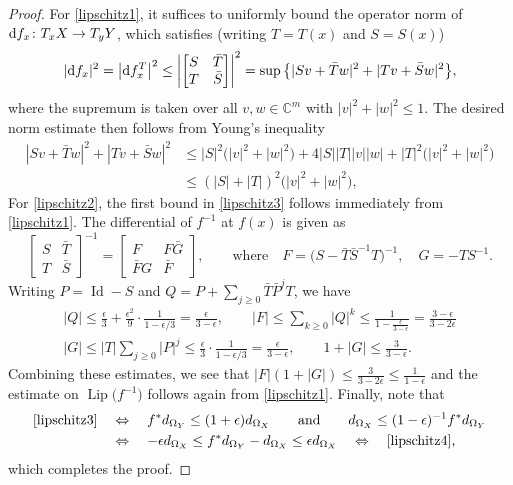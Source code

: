\documentclass[10pt,a4paper]{amsart}
\numberwithin{equation}{section}
\theoremstyle{definition}
\newcommand{\C}{\mathbb{C}} %
\newcommand{\1}{{\bf 1}}
\newcommand{\Id}{\operatorname{Id}}
\DeclareMathOperator{\Lip}{Lip}
\begin{document}
\begin{proof} For \ref{lipschitz1}, it suffices to uniformly bound the operator norm of ${\rm d}f_x\colon T_xX \rightarrow T_yY$, which satisfies (writing $T=T(x)$ and $S=S(x)$)
\[
\vert {\rm d}f_x \vert^2 = \big\vert {\rm d}f_x^T \big\vert^2 \le \left | \begin{bmatrix}
S &\bar T\\
T & \bar S
\end{bmatrix} \right|^2 =\sup \big\{|Sv + \bar T w|^2 +| Tv + \bar S w |^2\big\},
\]
where the supremum is taken over all $v,w\in \C^m$ with $|v|^2+|w|^2\le 1$. The desired norm estimate then follows from Young's inequality
\begin{align*}
|Sv + \bar T w|^2 +| Tv + \bar S w |^2 & \le |S|^2 \bigl(|v|^2 + |w|^2\bigr) + 4 |S||T||v||w|+ |T|^2 \bigl(|v|^2 + |w|^2\bigr) \\
& \le (|S| + |T|)^2\bigl(|v|^2+ |w|^2\bigr),
\end{align*}
For \ref{lipschitz2}, the first bound in \eqref{lipschitz3} follows immediately from \ref{lipschitz1}. The differential of $f^{-1}$ at $f(x)$ is given as
\begin{equation*}
\begin{bmatrix}
	S & \bar T\\
	T & \bar S
\end{bmatrix}^{-1} = \begin{bmatrix}
	F & F\bar G\\
	\bar F G & \bar F
\end{bmatrix},\qquad \text{where}\quad F= \bigl(S-\bar T \bar S^{-1}T\bigr)^{-1},\quad G= - TS^{-1}.
\end{equation*}
Writing $P=\Id - S$ and $Q = P + \sum_{j\ge 0}\bar T \bar P^j T$, we have
\begin{gather*}
|Q| \le \frac \epsilon 3 + \frac {\epsilon^2} 9 \cdot \frac{1}{1-\epsilon/3} = \frac \epsilon {3-\epsilon},\qquad \vert F\vert\le \sum_{k\ge 0}|Q|^k\le \frac{1}{1-\frac{\epsilon}{3-\epsilon}} = \frac{3-\epsilon}{3-2\epsilon}\\
|G| \le |T| \sum_{j\ge 0} |P|^j \le \frac \epsilon 3 \cdot \frac{1}{1-\epsilon/3} = \frac{\epsilon}{3-\epsilon},\qquad 1 + |G| \le \frac{3}{3-\epsilon}.
\end{gather*}
Combining these estimates, we see that
$
|F| (1+|G|) \le \frac{3}{3-2\epsilon} \le \frac{1}{1-\epsilon}
$
and the estimate on $\Lip\bigl(f^{-1}\bigr)$ follows again from \ref{lipschitz1}. Finally, note that
\begin{align*}
\eqref{lipschitz3}\quad &\Leftrightarrow \quad f^*d_{\Omega_Y} \le (1+\epsilon) d_{\Omega_X} \qquad\text{and}\qquad d_{\Omega_X}\le (1-\epsilon)^{-1} f^*d_{\Omega_Y}\\
&\Leftrightarrow \quad -\epsilon d_{\Omega_X} \le f^*d_{\Omega_Y} - d_{\Omega_X} \le \epsilon d_{\Omega_X}\quad \Leftrightarrow \quad \eqref{lipschitz4},
\end{align*}
which completes the proof.
\end{proof}
\end{document}
